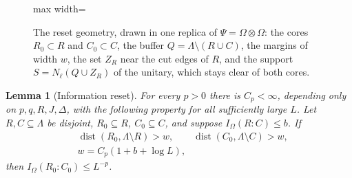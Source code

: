 \documentclass[aps,prx,reprint,superscriptaddress,floatfix,nofootinbib,longbibliography,amsmath,amssymb]{revtex4-2}
\newcommand{\dist}{\operatorname{dist}}
\newcommand{\Om}{\Omega}
\newcommand{\Lam}{\Lambda}
\theoremstyle{plain}
\newtheorem{lemma}[theorem]{Lemma}
\theoremstyle{definition}
\begin{document}
\begin{figure}[t]
\centering
\begin{adjustbox}{max width=\linewidth}

\end{adjustbox}
\caption{The reset geometry, drawn in one replica of $\Psi=\Omega\otimes\Omega$: the cores $R_0\subset R$ and $C_0\subset C$, the buffer $Q=\Lambda\setminus(R\cup C)$, the margins of width $w$, the set $Z_R$ near the cut edges of $R$, and the support $S=N_\ell(Q\cup Z_R)$ of the unitary, which stays clear of both cores.}\label{fig:chain-reset}
\end{figure}

\begin{lemma}[Information reset]\label{lem:reset}
For every $p>0$ there is $C_p<\infty$, depending only on $p,q,R,J,\Delta$,
with the following property for all sufficiently large $L$. Let
$R,C\subseteq\Lam$ be disjoint, $R_0\subseteq R$, $C_0\subseteq C$, and
suppose $I_\Om(R:C)\le b$. If
\[
\begin{split}
 &\dist(R_0,\Lam\setminus R)>w,\qquad \dist(C_0,\Lam\setminus C)>w,\\
 &w=C_p(1+b+\log L),
\end{split}
\]
then $I_\Om(R_0:C_0)\le L^{-p}$.
\end{lemma}
\end{document}
